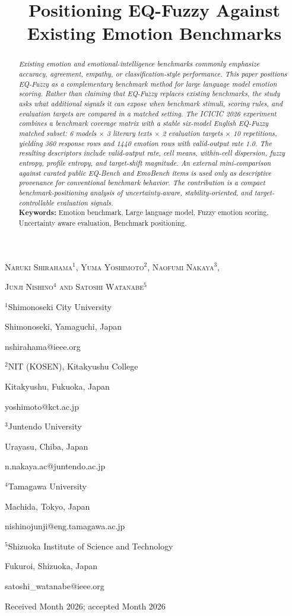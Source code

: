 \documentclass[12pt,a4paper]{icicel}
\title[ICICIC 2026]
      {Positioning EQ-Fuzzy Against Existing Emotion Benchmarks}
\author[N. Shirahama, Y. Yoshimoto, N. Nakaya, J. Nishino and S. Watanabe]{}
\begin{document}
\maketitle

\centerline{\scshape Naruki Shirahama$^1$, Yuma Yoshimoto$^2$, Naofumi Nakaya$^3$,}
\centerline{\scshape Junji Nishino$^4$ and Satoshi Watanabe$^5$}
\medskip
{\footnotesize
\centerline{$^1$Shimonoseki City University}
\centerline{Shimonoseki, Yamaguchi, Japan}
\centerline{nshirahama@ieee.org}}
\medskip
{\footnotesize
\centerline{$^2$NIT (KOSEN), Kitakyushu College}
\centerline{Kitakyushu, Fukuoka, Japan}
\centerline{yoshimoto@kct.ac.jp}}
\medskip
{\footnotesize
\centerline{$^3$Juntendo University}
\centerline{Urayasu, Chiba, Japan}
\centerline{n.nakaya.ac@juntendo.ac.jp}}
\medskip
{\footnotesize
\centerline{$^4$Tamagawa University}
\centerline{Machida, Tokyo, Japan}
\centerline{nishinojunji@eng.tamagawa.ac.jp}}
\medskip
{\footnotesize
\centerline{$^5$Shizuoka Institute of Science and Technology}
\centerline{Fukuroi, Shizuoka, Japan}
\centerline{satoshi\_watanabe@ieee.org}}
\medskip

\centerline{Received Month 2026; accepted Month 2026}


\medskip

\begin{abstract}
{\em
Existing emotion and emotional-intelligence benchmarks commonly emphasize
accuracy, agreement, empathy, or classification-style performance.
This paper positions EQ-Fuzzy as a complementary benchmark method for large
language model emotion scoring.
Rather than claiming that EQ-Fuzzy replaces existing benchmarks, the study asks
what additional signals it can expose when benchmark stimuli, scoring rules,
and evaluation targets are compared in a matched setting.
The ICICIC 2026 experiment combines a benchmark coverage matrix with a
stable six-model English EQ-Fuzzy matched subset:
6 models $\times$ 3 literary texts $\times$ 2 evaluation targets $\times$
10 repetitions, yielding 360 response rows and 1440 emotion rows with
valid-output rate 1.0.
The resulting descriptors include valid-output rate, cell means,
within-cell dispersion, fuzzy entropy, profile entropy, and target-shift
magnitude.
An external mini-comparison against curated public EQ-Bench and EmoBench items
is used only as descriptive provenance for conventional benchmark behavior.
The contribution is a compact benchmark-positioning analysis of
uncertainty-aware, stability-oriented, and target-controllable evaluation
signals.
}\\
{\bf Keywords:} Emotion benchmark, Large language model, Fuzzy emotion scoring,
Uncertainty aware evaluation, Benchmark positioning.
\end{abstract}
\end{document}
